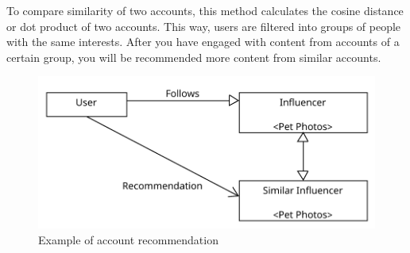 To compare similarity of two accounts, this method calculates the cosine distance or dot product of two accounts. \cite{ig-explore} This way, users are filtered into groups of people with the same interests. After you have engaged with content from accounts of a certain group, you will be recommended more content from similar accounts. 

\begin{figure}[h]
    \centering
    \includegraphics[width=0.7\linewidth]{Diagrams/collaborative-filtering.pdf}
    \caption{Example of account recommendation}
    \label{fig:collaborative-filtering-diagram}
\end{figure}